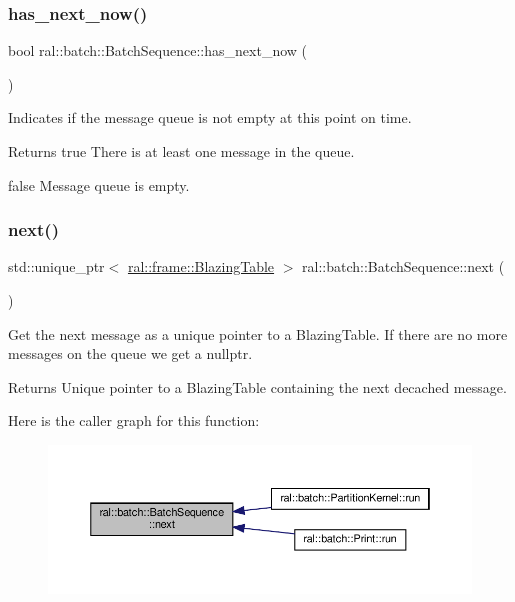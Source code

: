 \subsubsection{\texorpdfstring{has\+\_\+next\+\_\+now()}{has\_next\_now()}}
{\footnotesize\ttfamily bool ral\+::batch\+::\+Batch\+Sequence\+::has\+\_\+next\+\_\+now (\begin{DoxyParamCaption}{ }\end{DoxyParamCaption})}

Indicates if the message queue is not empty at this point on time. \begin{DoxyReturn}{Returns}
true There is at least one message in the queue. 

false Message queue is empty. 
\end{DoxyReturn}
\mbox{\label{classral_1_1batch_1_1BatchSequence_a5fe181e6183df338739e61eb512c23a4}} 
\subsubsection{\texorpdfstring{next()}{next()}}
{\footnotesize\ttfamily std\+::unique\+\_\+ptr$<$ \hyperlink{classral_1_1frame_1_1BlazingTable}{ral\+::frame\+::\+Blazing\+Table} $>$ ral\+::batch\+::\+Batch\+Sequence\+::next (\begin{DoxyParamCaption}{ }\end{DoxyParamCaption})}

Get the next message as a unique pointer to a Blazing\+Table. If there are no more messages on the queue we get a nullptr. \begin{DoxyReturn}{Returns}
Unique pointer to a Blazing\+Table containing the next decached message. 
\end{DoxyReturn}
Here is the caller graph for this function\+:\nopagebreak
\begin{figure}[H]
\begin{center}
\leavevmode
\includegraphics[width=350pt]{classral_1_1batch_1_1BatchSequence_a5fe181e6183df338739e61eb512c23a4_icgraph}
\end{center}
\end{figure}
\mbox{\label{classral_1_1batch_1_1BatchSequence_a92ce0d4e310caded265fceab3f4c266a}} 
